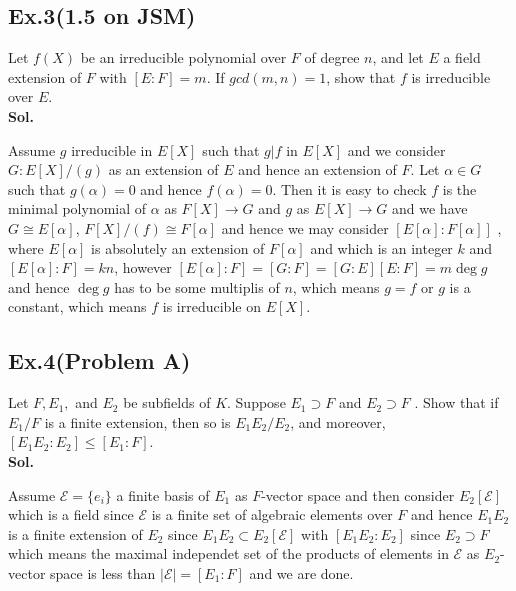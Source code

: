 \documentclass[lang=en,11pt,a4paper,citestyle =authoryear]{elegantpaper}
\begin{document}
\subsection*{Ex.3(1.5 on JSM)} 
Let $f(X)$ be an irreducible polynomial over $F$ of degree $n$, and let $E$ a field extension of $F$ with $[E:F] = m$. If $gcd(m,n) = 1$, show that $f$ is irreducible over $E$.
\vspace{0.5em}\\
\textbf{Sol.} \par
    Assume $g$ irreducible in $E[X]$ such that $g|f$ in $E[X]$ and we consider $G:E[X]/(g)$ as an extension of $E$ and hence an extension of $F$. Let $\alpha \in G$ such that $g(\alpha) = 0$ and hence $f(\alpha) = 0$. Then it is easy to check $f$ is the minimal polynomial of $\alpha$ as $F[X] \to G$ and $g$ as $E[X] \to G$ and we have $G \cong E[\alpha]$, $F[X]/(f) \cong F[\alpha]$ and hence we may consider $[E[\alpha]:F[\alpha]]$ , where $E[\alpha]$ is absolutely an extension of $F[\alpha]$ and which is an integer $k$ and $[E[\alpha]:F] = kn$, however $[E[\alpha]:F] = [G:F] = [G:E][E:F] = m\deg g$ and hence $\deg g$ has to be some multiplis of $n$, which means $g = f$ or $g$ is a constant, which means $f$ is irreducible on $E[X]$.
\par 
\vspace{0.5em}

\subsection*{Ex.4(Problem A)} 
Let $F , E_1,$ and $E_2$ be subfields of $K$. Suppose $E_1 \supset F$ and $E_2 \supset F$ . Show that if $E_1/F$ is a finite extension, then so is $E_1E_2/E_2$, and moreover,
$[E_1E_2 : E_2] \leq [E_1 : F ]$.
\vspace{0.5em}\\
\textbf{Sol.} \par
Assume $\mathcal{E} = \{e_i\}$ a finite basis of $E_1$ as $F$-vector space and then consider $E_2[\mathcal{E}]$ which is a field since $\mathcal{E}$ is a finite set of algebraic elements over $F$ and hence $E_1E_2$ is a finite extension of $E_2$ since $E_1E_2 \subset E_2[\mathcal{E}]$ with $[E_1E_2:E_2]$ since $E_2 \supset F$ which means the maximal independet set of the products of elements in $\mathcal{E}$ as $E_2$-vector space is less than $|\mathcal{E}| = [E_1:F]$ and we are done.
\par 
\vspace{0.5em}
\end{document}
